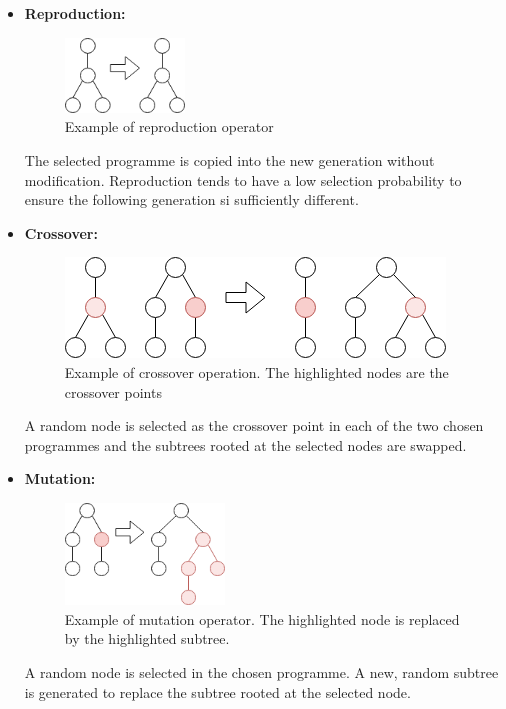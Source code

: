 \documentclass{article}
\begin{document}
	\begin{itemize}
		\item \textbf{Reproduction:} 
		
		\begin{figure}[h]
			\centering
			\includegraphics[width=0.3\textwidth]{5_reproduction}
			\caption{Example of reproduction operator}
			\label{fig:reproduction}
		\end{figure}
		
		The selected programme is copied into the new generation without modification. Reproduction tends to have a low selection probability to ensure the following generation si sufficiently different.
		
		\item \textbf{Crossover:} 
		
		\begin{figure}[h]
			\centering
			\includegraphics[height=0.2\textwidth]{6_crossover}
			\caption{Example of crossover operation. The highlighted nodes are the crossover points}
			\label{fig:crossover}
		\end{figure}
		
		A random node is selected as the crossover point in each of the two chosen programmes and the subtrees rooted at the selected nodes are swapped.
		
		
		\item \textbf{Mutation:} 
		
		\begin{figure}[h]
			\centering
			\includegraphics[width=0.4\textwidth]{7_mutation}
			\caption{Example of mutation operator. The highlighted node is replaced by the highlighted subtree.}
			\label{fig:mutation}
		\end{figure}
		
		A random node is selected in the chosen programme. A new, random subtree is generated to replace the subtree rooted at the selected node.
	\end{itemize}
	
\end{document}

